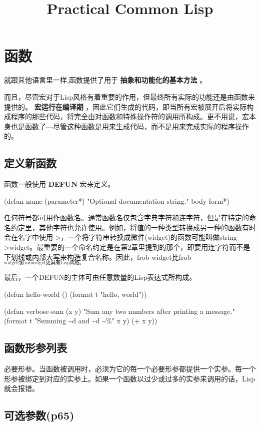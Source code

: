 \documentclass{ctexart}
\date{}
\title{Practical Common Lisp}
\begin{document}
\maketitle
\tableofcontents


\section{函数}
\label{sec-1}
就跟其他语言里一样,函数提供了用于 \textbf{抽象和功能化的基本方法} 。

而且，尽管宏对于Lisp风格有着重要的作用，但最终所有实际的功能还是由函数来提供的。 \textbf{宏运行在编译期} ，因此它们生成的代码，即当所有宏被展开后将实际构成程序的那些代码，将完全由对函数和特殊操作符的调用所构成。更不用说，宏本身也是函数了---尽管这种函数是用来生成代码，而不是用来完成实际的程序操作的。

\subsection{定义新函数}
\label{sec-1-1}
函数一般使用 \textbf{DEFUN} 宏来定义。

(defun name (parameter*)
  "Optional documentation string."
  body-form*)

任何符号都可用作函数名。通常函数名仅包含字典字符和连字符，但是在特定的命名约定里，其他字符也允许使用。例如，将值的一种类型转换成另一种的函数有时会在名字中使用->，一个将字符串转换成微件(widget)的函数可能叫做string->widget。最重要的一个命名约定是在第2章里提到的那个，即要用连字符而不是下划线或内部大写来构造复合名称。因此，frob-widget比frob$_{\text{widget或frobwidget更具有Lisp风格。}}$

最后，一个DEFUN的主体可由任意数量的Lisp表达式所构成。

(defun hello-world ()
  (format t "hello, world"))

(defun verbose-sum (x y)
  "Sum any two numbers after printing a message."
  (format t "Summing \textasciitilde{}d and \textasciitilde{}d \textasciitilde{}\%" x y)
  (+ x y))

\subsection{函数形参列表}
\label{sec-1-2}
必要形参。当函数被调用时，必须为它的每一个必要形参都提供一个实参。每一个形参被绑定到对应的实参上。如果一个函数以过少或过多的实参来调用的话，Lisp就会报错。
\subsection{可选参数(p65)}
\label{sec-1-3}
\end{document}
